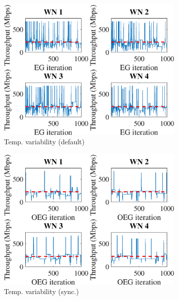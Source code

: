 \documentclass[preprint,12pt]{article}
\begin{document}
\begin{figure}[h!]
\begin{subfigure}[b]{.33\textwidth}
		\includegraphics[width=\textwidth]{images/temporal_individual_tpt_EG}
		\caption{Temp. variability  (default)}\label{fig:temporal_individual_tpt_EG}
	\end{subfigure}
	\begin{subfigure}[b]{.33\textwidth}
		\includegraphics[width=\textwidth]{images/temporal_individual_tpt_OEG}
		\caption{Temp. variability  (sync.)}\label{fig:temporal_individual_tpt_OEG}
	\end{subfigure}\\
	\begin{subfigure}[b]{.33\textwidth}

\end{subfigure}
\end{figure}
\end{document}
